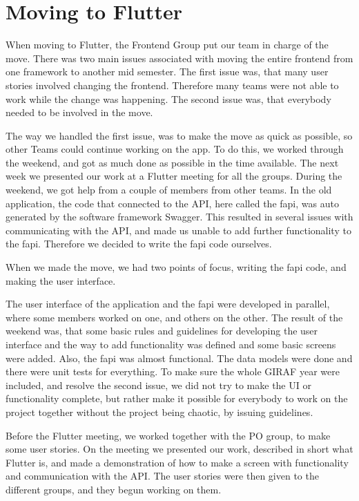 \section{Moving to Flutter}
When moving to Flutter, the Frontend Group put our team in charge of the move. 
There was two main issues associated with moving the entire frontend from one framework to another mid semester.
The first issue was, that many user stories involved changing the frontend. Therefore many teams were not able to work while the change was happening.
The second issue was, that everybody needed to be involved in the move. 

The way we handled the first issue, was to make the move as quick as possible, so other Teams could continue working on the app. 
To do this, we worked through the weekend, and got as much done as possible in the time available. The next week we presented our work at a Flutter meeting for all the groups. 
During the weekend, we got help from a couple of members from other teams. 
In the old application, the code that connected to the API, here called the \gls{fapi}, was auto generated by the software framework Swagger.
This resulted in several issues with communicating with the API, and made us unable to add further functionality to the \gls{fapi}. 
Therefore we decided to write the \gls{fapi} code ourselves. 

When we made the move, we had two points of focus, writing the \gls{fapi} code, and making the user interface.

The user interface of the application and the \gls{fapi} were developed in parallel, where some members worked on one, and others on the other. 
The result of the weekend was, that some basic rules and guidelines for developing the user interface and the way to add functionality was defined and some basic \glspl{screen} were added. Also, the \gls{fapi} was almost functional. The data models were done and there were unit tests for everything.
To make sure the whole GIRAF year were included, and resolve the second issue, we did not try to make the UI or functionality complete, but rather make it possible for everybody to work on the project together without the project being chaotic, by issuing guidelines. 

Before the Flutter meeting, we worked together with the PO group, to make some user stories. 
On the meeting we presented our work, described in short what Flutter is, and made a demonstration of how to make a \gls{screen} with functionality and communication with the API.
The user stories were then given to the different groups, and they begun working on them. 